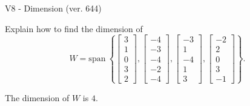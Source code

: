 \begin{exercise}
  \begin{exerciseTitle}V8 - Dimension (ver. 644)\end{exerciseTitle}
  \begin{exerciseStatement}
    Explain how to find the dimension of 
\[W=\mathrm{span}\ \left\{\left[\begin{array}{r}
3 \\
1 \\
0 \\
3 \\
2
\end{array}\right] , \left[\begin{array}{r}
-4 \\
-3 \\
-4 \\
-2 \\
-4
\end{array}\right] , \left[\begin{array}{r}
-3 \\
1 \\
-4 \\
1 \\
3
\end{array}\right] , \left[\begin{array}{r}
-2 \\
2 \\
0 \\
3 \\
-1
\end{array}\right]\right\}.\]



  \end{exerciseStatement}
  \begin{exerciseAnswer}
   The dimension of \(W\) is  \(4\).
  


  \end{exerciseAnswer}
\end{exercise}